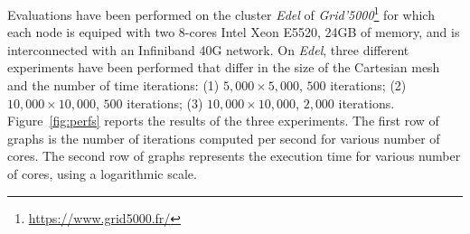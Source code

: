 Evaluations have been performed on the cluster \emph{Edel} of \emph{Grid'5000}\footnote{\url{https://www.grid5000.fr/}} for which each node is equiped with two 8-cores Intel Xeon E5520, 24GB of memory, and is interconnected with an Infiniband 40G network. %
On \emph{Edel}, three different experiments have been performed that differ in the size of the Cartesian mesh and the number of time iterations: (1) $5,000 \times 5,000$, $500$ iterations; (2) $10,000 \times 10,000$, $500$ iterations; (3) $10,000 \times 10,000$, $2,000$ iterations.
Figure~\ref{fig:perfs} reports the results of the three experiments. The first row of graphs is the number of iterations computed per second for various number of cores. The second row of graphs represents the execution time for various number of cores, using a logarithmic scale.

